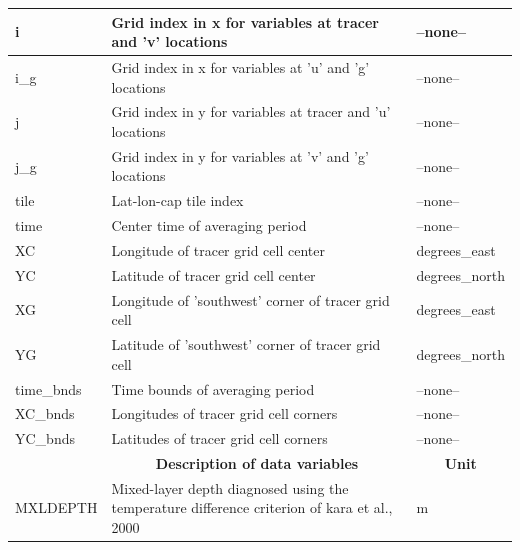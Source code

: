 \begin{longtable}{|m{}|m{}|m{}|}
i &Grid index in x for variables at tracer and 'v' locations &--none--  \\ \hline
i\_g &Grid index in x for variables at 'u' and 'g' locations &--none--  \\ \hline
j &Grid index in y for variables at tracer and 'u' locations &--none--  \\ \hline
j\_g &Grid index in y for variables at 'v' and 'g' locations &--none--  \\ \hline
tile &Lat-lon-cap tile index &--none--  \\ \hline
time &Center time of averaging period &--none--  \\ \hline
XC &Longitude of tracer grid cell center &degrees\_east  \\ \hline
YC &Latitude of tracer grid cell center &degrees\_north  \\ \hline
XG &Longitude of 'southwest' corner of tracer grid cell &degrees\_east  \\ \hline
YG &Latitude of 'southwest' corner of tracer grid cell &degrees\_north  \\ \hline
time\_bnds &Time bounds of averaging period &--none--  \\ \hline
XC\_bnds &Longitudes of tracer grid cell corners &--none--  \\ \hline
YC\_bnds &Latitudes of tracer grid cell corners &--none--  \\ \hline
\rowcolor{lightgray} \multicolumn{1}{|c|}{\textbf{Variables}} & \multicolumn{1}{|c|}{\textbf{Description of data variables}} &  \multicolumn{1}{|c|}{\textbf{Unit}}\\ \hline
MXLDEPTH &Mixed-layer depth diagnosed using the temperature difference criterion of kara et al., 2000 &m  \\ \hline
\end{longtable}

\newp
\pagebreak
